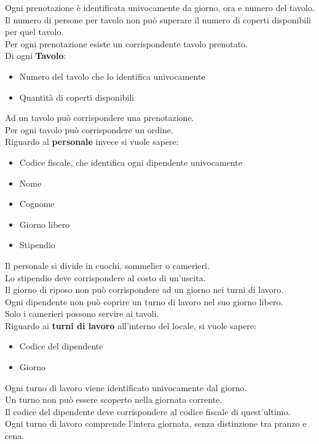 Ogni prenotazione è identificata univocamente da giorno, ora e numero del tavolo. \\
Il numero di persone per tavolo non può superare il numero di coperti disponibili per quel tavolo. \\ 
Per ogni prenotazione esiste un corrispondente tavolo prenotato. \medskip \\ 
Di ogni \textbf{Tavolo}:
\begin{itemize}
    \item Numero del tavolo che lo identifica univocamente
    \item Quantità di coperti disponibili
\end{itemize}
Ad un tavolo può corrispondere una prenotazione. \\
Per ogni tavolo può corrispondere un ordine. \medskip \\
Riguardo al \textbf{personale} invece si vuole sapere:
\begin{itemize}
    \item Codice fiscale, che identifica ogni dipendente univocamente
    \item Nome 
    \item Cognome 
    \item Giorno libero
    \item Stipendio
\end{itemize}
Il personale si divide in cuochi, sommelier o camerieri.\\
Lo stipendio deve corrispondere al costo di un'uscita. \\
Il giorno di riposo non può corrispondere ad un giorno nei turni di lavoro. \\
Ogni dipendente non può coprire un turno di lavoro nel suo giorno libero. \\
Solo i camerieri possono servire ai tavoli. \medskip \\
Riguardo ai \textbf{turni di lavoro} all’interno del locale, si vuole sapere:
\begin{itemize}
    \item Codice del dipendente
    \item Giorno
\end{itemize}
Ogni turno di lavoro viene identificato univocamente dal giorno.\\
Un turno non può essere scoperto nella giornata corrente. \\
Il codice del dipendente deve corrispondere al codice fiscale di quest'ultimo. \\
Ogni turno di lavoro comprende l'intera giornata, senza distinzione tra pranzo e cena.

